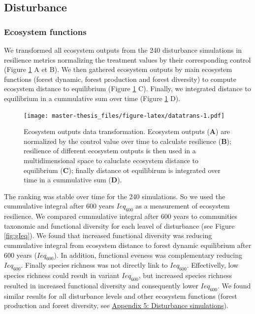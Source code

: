 \documentclass[12pt,]{article}
\theoremstyle{definition}
\theoremstyle{definition}
\theoremstyle{remark}
\begin{document}
\subsection{Disturbance}\label{disturbance-1}

\subsubsection{Ecosystem functions}\label{ecosystem-functions-1}

We transformed all ecosystem outputs from the 240 disturbance
simulations in resilience metrics normalizing the treatment values by
their corresponding control (Figure \ref{fig:datatrans} A et B). We then
gathered ecosystem outputs by main ecosystem functions (forest dynamic,
forest production and forest diversity) to compute ecosystem distance to
equilibrium (Figure \ref{fig:datatrans} C). Finally, we integrated
distance to equilibrium in a cummulative sum over time (Figure
\ref{fig:datatrans} D).

\begin{figure}[htbp]
\centering
\texttt{[image: master-thesis\_files/figure-latex/datatrans-1.pdf]}
\caption{\label{fig:datatrans}Ecosystem outputs data transformation.
Ecosystem outputs (\textbf{A}) are normalized by the control value over
time to calculate resilience (\textbf{B}); resilience of different
ecosystem outputs is then used in a multidimensional space to caluclate
ecosystem distance to equilibrium (\textbf{C}); finally distance ot
equilibirum is integrated over time in a cummulative sum (\textbf{D}).}
\end{figure}

The ranking was stable over time for the 240 simulations. So we used the
cummulative integral after 600 years \(Ieq_{600}\) as a measurement of
ecosystem resilience. We compared cummulative integral after 600 years
to communities taxonomic and functional diversity for each leavel of
disturbance (see Figure \ref{fig:gIeq}). We found that increased
functional diversity \citep[FDiv,][]{villeger_new_2008} was reducing
cummulative integral from ecosystem distance to forest dynamic
equilibrium after 600 years (\(Ieq_{600}\)). In addition, functional
eveness was complementary reducing \(Ieq_{600}\). Finally species
richness was not directly link to \(Ieq_{600}\). Effectivelly, low
species richness could result in variant \(Ieq_{600}\), but increased
species richness resulted in increased functional diversity and
consequently lower \(Ieq_{600}\). We found similar results for all
disturbance levels and other ecosystem functions (forest production and
forest diversity, see
\protect\hyperlink{appendix-5-disturbance-simulations}{Appendix 5:
Disturbance simulations}).
\end{document}
